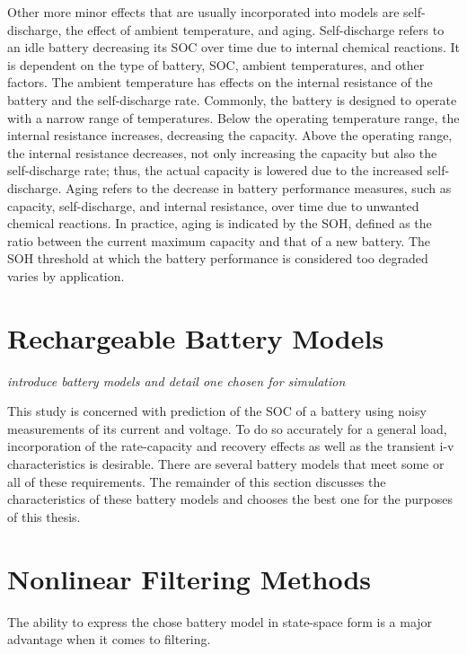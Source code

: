 Other more minor effects that are usually incorporated into models are self-discharge, the effect of ambient temperature, and aging. Self-discharge refers to an idle battery decreasing its SOC over time due to internal chemical reactions. It is dependent on the type of battery, SOC, ambient temperatures, and other factors. The ambient temperature has effects on the internal resistance of the battery and the self-discharge rate. Commonly, the battery is designed to operate with a narrow range of temperatures. Below the operating temperature range, the internal resistance increases, decreasing the capacity. Above the operating range, the internal resistance decreases, not only increasing the capacity but also the self-discharge rate; thus, the actual capacity is lowered due to the increased self-discharge. Aging refers to the decrease in battery performance measures, such as capacity, self-discharge, and internal resistance, over time due to unwanted chemical reactions. In practice, aging is indicated by the SOH, defined as the ratio between the current maximum capacity and that of a new battery. The SOH threshold at which the battery performance is considered too degraded varies by application.


\section{Rechargeable Battery Models}

\emph{introduce battery models and detail one chosen for simulation}

This study is concerned with prediction of the SOC of a battery using noisy measurements of its current and voltage. To do so accurately for a general load, incorporation of the rate-capacity and recovery effects as well as the transient i-v characteristics is desirable. There are several battery models that meet some or all of these requirements. The remainder of this section discusses the characteristics of these battery models and chooses the best one for the purposes of this thesis.




\section{Nonlinear Filtering Methods}

The ability to express the chose battery model in state-space form is a major advantage when it comes to filtering. %
